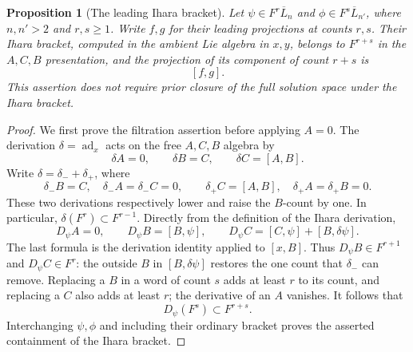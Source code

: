 \documentclass[11pt]{article}
\newtheorem{proposition}[theorem]{Proposition}
\theoremstyle{definition}
\theoremstyle{remark}
\numberwithin{equation}{section}
\begin{document}
\begin{proposition}[The leading Ihara bracket]
\label{prop:leading-ihara}
Let $\psi\in F^r\overline L_n$ and
$\phi\in F^s\overline L_{n'}$, where $n,n'>2$ and $r,s\geq1$.
Write $f,g$ for their leading projections at counts $r,s$.
Their Ihara bracket, computed in the ambient Lie algebra in
$x,y$, belongs to $F^{r+s}$ in the $A,C,B$ presentation, and
the projection of its component of count $r+s$ is
\begin{equation}
 \label{eq:leading-ihara}
 [f,g].
\end{equation}
This assertion does not require prior closure of the full solution
space under the Ihara bracket.
\end{proposition}

\begin{proof}
We first prove the filtration assertion before applying $A=0$.
The derivation $\delta=\operatorname{ad}_x$ acts on the free $A,C,B$ algebra by
\[
 \delta A=0,\qquad \delta B=C,\qquad \delta C=[A,B].
\]
Write $\delta=\delta_-+\delta_+$, where
\[
 \delta_-B=C,\quad \delta_-A=\delta_-C=0,
 \qquad
 \delta_+C=[A,B],\quad \delta_+A=\delta_+B=0.
\]
These two derivations respectively lower and raise the $B$-count
by one.  In particular, $\delta(F^r)\subset F^{r-1}$.
Directly from the definition of the Ihara derivation,
\begin{equation}
 \label{eq:ihara-abc-action}
 D_\psi A=0,\qquad
 D_\psi B=[B,\psi],\qquad
 D_\psi C=[C,\psi]+[B,\delta\psi].
\end{equation}
The last formula is the derivation identity applied to $[x,B]$.
Thus $D_\psi B\in F^{r+1}$ and $D_\psi C\in F^r$:
the outside $B$ in $[B,\delta\psi]$ restores the one count that
$\delta_-$ can remove.  Replacing a $B$ in a word of count $s$
adds at least $r$ to its count, and replacing a $C$ also adds at
least $r$; the derivative of an $A$ vanishes.
It follows that
\[
 D_\psi(F^s)\subset F^{r+s}.
\]
Interchanging $\psi,\phi$ and including their ordinary bracket
proves the asserted containment of the Ihara bracket.


\end{proof}
\end{document}
